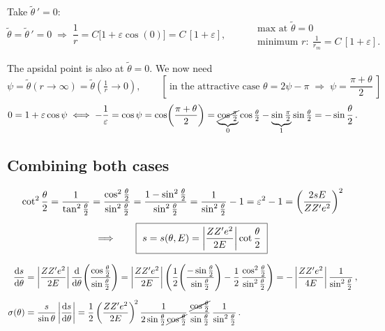 \documentclass[11pt]{article}
\newcommand{\half}[1]{\tfrac{#1}{2}}
\begin{document}
Take $\tilde\theta\,' = 0$:
\[
\tilde\theta = \tilde\theta\,' = 0 \;\Rightarrow\;
\frac{1}{r} = C\bigl[1 + \varepsilon\cos(0)\bigr] = C\,[1+\varepsilon],
\qquad
\begin{aligned}
&\text{max at } \tilde\theta = 0\\
&\text{minimum } r:\ \frac{1}{r_{m}} = C\,[1+\varepsilon].
\end{aligned}
\]

The apsidal point is also at $\tilde\theta = 0$. We now need
\[
\psi = \tilde\theta(r\to\infty) = \tilde\theta\!\left(\tfrac{1}{r}\to 0\right),
\qquad
\left[\ \text{in the attractive case } \theta = 2\psi - \pi
 \;\Rightarrow\; \psi = \frac{\pi+\theta}{2}\ \right]
\]
\[
0 = 1 + \varepsilon\cos\psi
\iff -\frac{1}{\varepsilon} = \cos\psi = \cos\!\left(\frac{\pi+\theta}{2}\right)
 = \underbrace{\cancel{\cos\half{\pi}}}_{0}\cos\half{\theta}
 - \underbrace{\sin\half{\pi}}_{1}\sin\half{\theta}
 = -\sin\frac{\theta}{2}\,.
\]

\subsection*{Combining both cases}

\begin{gather*}
\cot^{2}\frac{\theta}{2} = \frac{1}{\tan^{2}\frac{\theta}{2}}
 = \frac{\cos^{2}\frac{\theta}{2}}{\sin^{2}\frac{\theta}{2}}
 = \frac{1-\sin^{2}\frac{\theta}{2}}{\sin^{2}\frac{\theta}{2}}
 = \frac{1}{\sin^{2}\frac{\theta}{2}} - 1
 = \varepsilon^{2} - 1
 = \left(\frac{2sE}{Z Z' e^{2}}\right)^{2}\\[4pt]
\Longrightarrow\qquad
\boxed{\ s = s(\theta,E) = \left\lvert \frac{Z Z' e^{2}}{2E}\right\rvert
   \cot\frac{\theta}{2}\ }
\end{gather*}

\begin{align*}
\frac{\mathrm{d} s}{\mathrm{d} \theta}
 &= \left\lvert \frac{Z Z' e^{2}}{2E}\right\rvert
    \frac{\mathrm{d} }{\mathrm{d} \theta}\!\left(\frac{\cos\frac{\theta}{2}}{\sin\frac{\theta}{2}}\right)
  = \left\lvert \frac{Z Z' e^{2}}{2E}\right\rvert
    \left(\frac{1}{2}\!\left(\frac{-\sin\frac{\theta}{2}}{\sin\frac{\theta}{2}}\right)
      - \frac{1}{2}\,\frac{\cos^{2}\frac{\theta}{2}}{\sin^{2}\frac{\theta}{2}}\right)
  = -\left\lvert \frac{Z Z' e^{2}}{4E}\right\rvert
    \frac{1}{\sin^{2}\frac{\theta}{2}}\,,\\[6pt]
\sigma(\theta)
 &= \frac{s}{\sin\theta}\left\lvert \frac{\mathrm{d} s}{\mathrm{d} \theta}\right\rvert
  = \frac{1}{2}\left(\frac{Z Z' e^{2}}{2E}\right)^{\!2}
    \frac{1}{2\sin\frac{\theta}{2}\,\cancel{\cos\frac{\theta}{2}}}\,
    \frac{\cancel{\cos\frac{\theta}{2}}}{\sin\frac{\theta}{2}}\,
    \frac{1}{\sin^{2}\frac{\theta}{2}}\,.
\end{align*}
\end{document}
